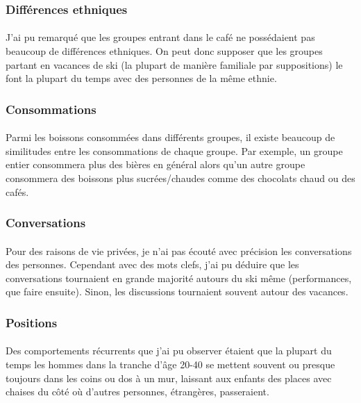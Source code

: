 \subsubsection{Différences ethniques}

\paragraph{} J'ai pu remarqué que les groupes entrant dans le café ne
possédaient pas beaucoup de différences ethniques. On peut donc supposer que
les groupes partant en vacances de ski (la plupart de manière familiale par
suppositions) le font la plupart du temps avec des personnes de la même ethnie.

\subsubsection{Consommations}

\paragraph{} Parmi les boissons consommées dans différents groupes, il existe
beaucoup de similitudes entre les consommations de chaque groupe. Par exemple,
un groupe entier consommera plus des bières en général alors qu'un autre groupe
consommera des boissons plus sucrées/chaudes comme des chocolats chaud ou des
cafés.

\subsubsection{Conversations}

\paragraph{} Pour des raisons de vie privées, je n'ai pas écouté avec précision
les conversations des personnes. Cependant avec des mots clefs, j'ai pu déduire
que les conversations tournaient en grande majorité autours du ski même
(performances, que faire ensuite). Sinon, les discussions tournaient souvent
autour des vacances.

\subsubsection{Positions}

\paragraph{} Des comportements récurrents que j'ai pu observer étaient que la
plupart du temps les hommes dans la tranche d'âge 20-40 se mettent souvent ou
presque toujours dans les coins ou dos à un mur, laissant aux enfants des
places avec chaises du côté où d'autres personnes, étrangères, passeraient.

